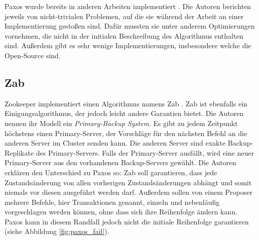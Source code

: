 Paxos wurde bereits in anderen Arbeiten implementiert \cite{paxos-made-complex, paxos-made-live}. Die Autoren berichten jeweils von nicht-trivialen Problemen, auf die sie während der Arbeit an einer Implementierung gestoßen sind. Dafür mussten sie unter anderem Optimierungen vornehmen, die nicht in der initialen Beschreibung des Algorithmus enthalten sind. Außerdem gibt es sehr wenige Implementierungen, insbesondere welche die Open-Source sind.

\subsection{Zab}


Zookeeper implementiert einen Algorithmus namens Zab \cite{zab}. Zab ist ebenfalls ein Einigungsalgorithmus, der jedoch leicht andere Garantien bietet. Die Autoren nennen ihr Modell ein \textit{Primary-Backup System}. Es gibt zu jedem Zeitpunkt höchstens einen Primary-Server, der Vorschläge für den nächsten Befehl an die anderen Server im Cluster senden kann. Die anderen Server sind exakte Backup-Replikate des Primary-Servers. Falls der Primary-Server ausfällt, wird eine neuer Primary-Server aus den vorhandenen Backup-Servers gewählt. Die Autoren erklären den Unterschied zu Paxos so: Zab soll garantieren, dass jede Zustandsänderung von allen vorherigen Zustandsänderungen abhängt und somit niemals vor diesen ausgeführt werden darf. Außerdem sollen von einem Proposer mehrere Befehle, hier Transaktionen genannt, einzeln und nebenläufig vorgeschlagen werden können, ohne dass sich ihre Reihenfolge ändern kann. Paxos kann in diesem Randfall jedoch nicht die initiale Reihenfolge garantieren (siehe Abbildung \ref{fig:paxos_fail}).

